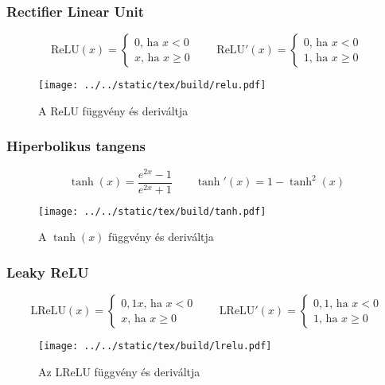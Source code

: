 \documentclass[../../main.tex]{subfiles}
\begin{document}
\subsubsection{Rectifier Linear Unit}
\[
  \mathrm{ReLU}(x) = \begin{cases}
    0 \text{, ha } x < 0 \\
    x \text{, ha } x \geq 0
  \end{cases}
  \qquad
  \mathrm{ReLU}'(x) = \begin{cases}
    0 \text{, ha } x < 0 \\
    1 \text{, ha } x \geq 0
  \end{cases}
\]
\begin{figure}[H]
  \centering
  \texttt{[image: ../../static/tex/build/relu.pdf]}
  \caption{A ReLU függvény és deriváltja}
  \label{fig:relu}
\end{figure}

\subsubsection{Hiperbolikus tangens}
\[
  \tanh(x) = \frac{e^{2x} - 1}{e^{2x} + 1}
  \qquad
  \tanh'(x) = 1 - \tanh^2(x)
\]
\begin{figure}[H]
  \centering
  \texttt{[image: ../../static/tex/build/tanh.pdf]}
  \caption{A $\tanh(x)$ függvény és deriváltja}
  \label{fig:tanh}
\end{figure}

\subsubsection{Leaky ReLU}
\[
  \mathrm{LReLU}(x) = \begin{cases}
    0,1x \text{, ha } x < 0 \\
    x \text{, ha } x \geq 0
  \end{cases}
  \qquad
  \mathrm{LReLU}'(x) = \begin{cases}
    0,1 \text{, ha } x < 0 \\
    1 \text{, ha } x \geq 0
  \end{cases}
\]
\begin{figure}[H]
  \centering
  \texttt{[image: ../../static/tex/build/lrelu.pdf]}
  \caption{Az LReLU függvény és deriváltja}
  \label{fig:lrelu}
\end{figure}
\end{document}
